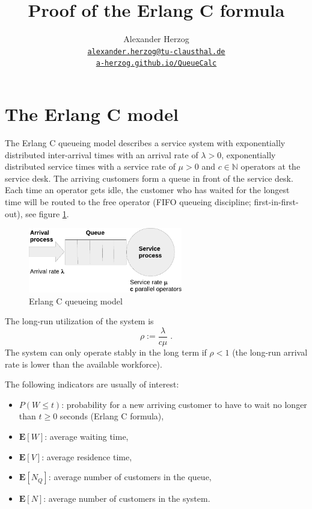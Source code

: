 \documentclass[a4paper,11pt,oneside]{article}
\theoremstyle{definition}
\begin{document}
\title{Proof of the Erlang C formula}
\author{Alexander Herzog\\\href{mailto:alexander.herzog@tu-clausthal.de}{\small\texttt{alexander.herzog@tu-clausthal.de}}\\\href{https://a-herzog.github.io/QueueCalc/}{\small\texttt{a-herzog.github.io/QueueCalc}}}
\date{}

\maketitle



\section{The Erlang C model}

The Erlang C queueing model describes a service system with exponentially distributed inter-arrival times with an arrival rate of $\lambda>0$, exponentially distributed service times with a service rate of $\mu>0$ and $c\in\mathbb{N}$ operators at the service desk. The arriving customers form a queue in front of the service desk. Each time an operator gets idle, the customer who has waited for the longest time will be routed to the free operator (FIFO queueing discipline; first-in-first-out), see figure \ref{fig:Model}.

\begin{figure}[H]
\begin{center}
\includegraphics[width=0.6\textwidth]{ProofOfTheErlangCFormula-Model.pdf}
\end{center}
\caption{Erlang C queueing model}
\label{fig:Model}
\end{figure}

The long-run utilization of the system is
$$
\rho:=\frac{\lambda}{c\mu}\;.
$$
The system can only operate stably in the long term if $\rho<1$ (the long-run arrival rate is lower than the available workforce).

The following indicators are usually of interest:
\begin{itemize}
\item
$P(W\le t)$: probability for a new arriving customer to have to wait no longer than $t\ge0$ seconds (Erlang C formula),
\item
$\mathbf{E}[W]$: average waiting time,
\item
$\mathbf{E}[V]$: average residence time,
\item
$\mathbf{E}[N_Q]$: average number of customers in the queue,
\item
$\mathbf{E}[N]$: average number of customers in the system.
\end{itemize}
\end{document}
